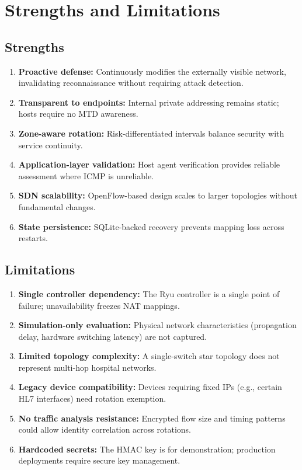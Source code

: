 \documentclass[conference]{IEEEtran}
\begin{document}
\section{Strengths and Limitations}

\subsection{Strengths}

\begin{enumerate}
    \item \textbf{Proactive defense:} Continuously modifies the externally visible network, invalidating reconnaissance without requiring attack detection.
    \item \textbf{Transparent to endpoints:} Internal private addressing remains static; hosts require no MTD awareness.
    \item \textbf{Zone-aware rotation:} Risk-differentiated intervals balance security with service continuity.
    \item \textbf{Application-layer validation:} Host agent verification provides reliable assessment where ICMP is unreliable.
    \item \textbf{SDN scalability:} OpenFlow-based design scales to larger topologies without fundamental changes.
    \item \textbf{State persistence:} SQLite-backed recovery prevents mapping loss across restarts.
\end{enumerate}

\subsection{Limitations}

\begin{enumerate}
    \item \textbf{Single controller dependency:} The Ryu controller is a single point of failure; unavailability freezes NAT mappings.
    \item \textbf{Simulation-only evaluation:} Physical network characteristics (propagation delay, hardware switching latency) are not captured.
    \item \textbf{Limited topology complexity:} A single-switch star topology does not represent multi-hop hospital networks.
    \item \textbf{Legacy device compatibility:} Devices requiring fixed IPs (e.g., certain HL7 interfaces) need rotation exemption.
    \item \textbf{No traffic analysis resistance:} Encrypted flow size and timing patterns could allow identity correlation across rotations.
    \item \textbf{Hardcoded secrets:} The HMAC key is for demonstration; production deployments require secure key management.
\end{enumerate}
\end{document}

